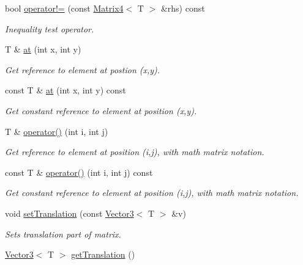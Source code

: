 \begin{DoxyCompactItemize}
bool \hyperlink{class_matrix4_a8558057b529d2441c3812bb37fe2c7c0}{operator!=} (const \hyperlink{class_matrix4}{Matrix4}$<$ T $>$ \&rhs) const 
\begin{DoxyCompactList}\small\item\em Inequality test operator. \item\end{DoxyCompactList}\item 
T \& \hyperlink{class_matrix4_a81152afb471fe9b150dba7b427d01555}{at} (int x, int y)
\begin{DoxyCompactList}\small\item\em Get reference to element at postion (x,y). \item\end{DoxyCompactList}\item 
const T \& \hyperlink{class_matrix4_a849f6ec28740c645f666501e49d2afd4}{at} (int x, int y) const 
\begin{DoxyCompactList}\small\item\em Get constant reference to element at position (x,y). \item\end{DoxyCompactList}\item 
T \& \hyperlink{class_matrix4_abcb2856588551e655f80da7c88e7c33e}{operator()} (int i, int j)
\begin{DoxyCompactList}\small\item\em Get reference to element at position (i,j), with math matrix notation. \item\end{DoxyCompactList}\item 
const T \& \hyperlink{class_matrix4_ad6b68f514be803e215ca967f9d5dc55c}{operator()} (int i, int j) const 
\begin{DoxyCompactList}\small\item\em Get constant reference to element at position (i,j), with math matrix notation. \item\end{DoxyCompactList}\item 
void \hyperlink{class_matrix4_ab6e5ff74b76ccabddb0109da608fdf04}{setTranslation} (const \hyperlink{class_vector3}{Vector3}$<$ T $>$ \&v)
\begin{DoxyCompactList}\small\item\em Sets translation part of matrix. \item\end{DoxyCompactList}\item 
\hyperlink{class_vector3}{Vector3}$<$ T $>$ \hyperlink{class_matrix4_a9c89b73d65fa5a0544efcf26829d8b5e}{getTranslation} ()

\end{DoxyCompactItemize}
